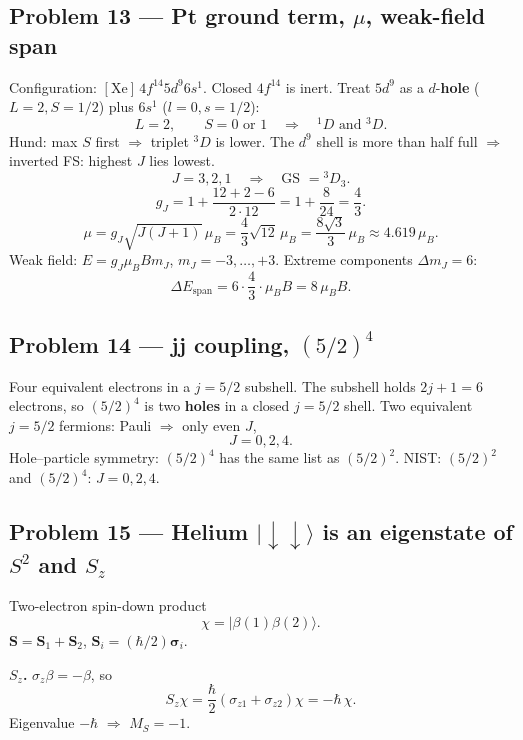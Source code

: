 \documentclass[11pt,a4paper]{article}
\begin{document}
\subsection{Problem 13 --- Pt ground term, \(\mu\), weak-field span}
Configuration: \([\mathrm{Xe}]\,4f^{14}5d^9 6s^1\). Closed \(4f^{14}\) is inert.
Treat \(5d^9\) as a \(d\)-\textbf{hole} (\(L=2,S=1/2\)) plus \(6s^1\) (\(l=0,s=1/2\)):
\[
L=2,\qquad S=0\text{ or }1 \quad\Rightarrow\quad {}^1D\text{ and }{}^3D.
\]
Hund: max \(S\) first \(\Rightarrow\) triplet \({}^3D\) is lower. The \(d^9\) shell is more than half full \(\Rightarrow\) inverted FS: highest \(J\) lies lowest.
\[
J=3,2,1 \quad\Rightarrow\quad \text{GS }={}^3D_3.
\]
\[
g_J=1+\frac{12+2-6}{2\cdot 12}=1+\frac{8}{24}=\frac43.
\]
\[
\mu=g_J\sqrt{J(J+1)}\,\mu_B=\frac43\sqrt{12}\,\mu_B=\frac{8\sqrt{3}}{3}\,\mu_B\approx 4.619\,\mu_B.
\]
Weak field: \(E=g_J\mu_B B m_J\), \(m_J=-3,\ldots,+3\). Extreme components \(\Delta m_J=6\):
\[
\Delta E_{\mathrm{span}}=6\cdot\frac43\cdot\mu_B B=8\,\mu_B B.
\]

\subsection{Problem 14 --- jj coupling, \((5/2)^4\)}
Four equivalent electrons in a \(j=5/2\) subshell. The subshell holds \(2j+1=6\) electrons, so \((5/2)^4\) is two \textbf{holes} in a closed \(j=5/2\) shell.
Two equivalent \(j=5/2\) fermions: Pauli \(\Rightarrow\) only even \(J\),
\[
J=0,2,4.
\]
Hole--particle symmetry: \((5/2)^4\) has the same list as \((5/2)^2\).
NIST: \((5/2)^2\) and \((5/2)^4\): \(J=0,2,4\).

\subsection{Problem 15 --- Helium \(\lvert\downarrow\downarrow\rangle\) is an eigenstate of \(S^2\) and \(S_z\)}
Two-electron spin-down product
\[
\chi=\lvert\beta(1)\beta(2)\rangle.
\]
\(\mathbf{S}=\mathbf{S}_1+\mathbf{S}_2\), \(\mathbf{S}_i=(\hbar/2)\boldsymbol{\sigma}_i\).

\textbf{\(S_z\).} \(\sigma_z\beta=-\beta\), so
\[
S_z\chi=\frac{\hbar}{2}(\sigma_{z1}+\sigma_{z2})\chi=-\hbar\,\chi.
\]
Eigenvalue \(-\hbar\) \(\Rightarrow\) \(M_S=-1\).
\end{document}
